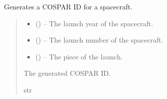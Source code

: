 \documentclass[letterpaper,10pt,english]{sphinxmanual}
\begin{document}
\begin{fulllineitems}
\label{\detokenize{fspsim.utils:fspsim.utils.Conversions.generate_cospar_id}}
\pysigstartsignatures
{}
\pysigstopsignatures
\sphinxAtStartPar
Generates a COSPAR ID for a spacecraft.
\begin{quote}\begin{description}
\begin{itemize}
\item {} 
\sphinxAtStartPar
{} () – The launch year of the spacecraft.

\item {} 
\sphinxAtStartPar
{} () – The launch number of the spacecraft.

\item {} 
\sphinxAtStartPar
{} () – The piece of the launch.

\end{itemize}

\sphinxAtStartPar
The generated COSPAR ID.

\sphinxAtStartPar
str

\end{description}\end{quote}

\end{fulllineitems}

\end{document}
